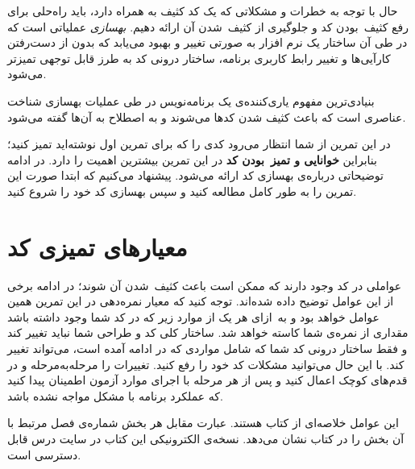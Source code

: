 \documentclass{utap}
\begin{document}
حال با توجه به خطرات و مشکلاتی که یک کد کثیف به همراه دارد، باید راه‌حلی برای رفع کثیف~بودن کد و جلو‌‌گیری از کثیف~شدن آن ارائه دهیم.
\textit{بهسازی} عملیاتی است که در طی آن ساختار یک نرم افزار به صورتی تغییر و بهبود می‌یابد که بدون از دست‌رفتن کارآیی‌ها و تغییر رابط کاربری برنامه، ساختار درونی کد به طرز قابل توجهی تمیزتر می‌شود.

بنیادی‌ترین مفهوم یاری‌کننده‌ی یک برنامه‌نویس در طی عملیات بهسازی شناخت عناصری است که باعث کثیف شدن کدها می‌شوند و به اصطلاح به آن‌ها  گفته می‌شود.

در این تمرین از شما انتظار می‌رود کدی را که برای تمرین اول نوشته‌اید تمیز کنید؛ بنابراین \textbf{خوانایی و تمیز~بودن کد} در این تمرین بیشترین اهمیت را دارد. در ادامه توضیحاتی درباره‌ی بهسازی کد ارائه می‌شود. پیشنهاد می‌کنیم که ابتدا صورت این تمرین را به طور کامل مطالعه کنید و سپس بهسازی کد خود را شروع کنید.

\section{معیارهای تمیزی کد}
عواملی در کد وجود دارند که ممکن است باعث کثیف~شدن آن شوند؛ در ادامه برخی از این عوامل توضیح داده شده‌اند. توجه کنید که معیار نمره‌دهی در این تمرین همین عوامل خواهد بود و به~ازای هر یک از موارد زیر که در کد شما وجود داشته باشد مقداری از نمره‌ی شما کاسته خواهد شد. ساختار کلی کد و طراحی شما نباید تغییر کند و فقط ساختار درونی کد شما که شامل مواردی که در ادامه آمده است، می‌تواند تغییر کند. با این حال می‌توانید مشکلات کد خود را رفع کنید. تغییرات را مرحله‌به‌مرحله و در قدم‌های کوچک اعمال کنید و پس از هر مرحله با اجرای موارد آزمون اطمینان پیدا کنید که عملکرد برنامه با مشکل مواجه نشده باشد.

این عوامل خلاصه‌ای از کتاب  هستند. عبارت مقابل هر بخش شماره‌ی فصل مرتبط با آن بخش را در کتاب نشان می‌دهد.
نسخه‌ی الکترونیکی این کتاب در سایت درس قابل دسترسی است.
\end{document}
